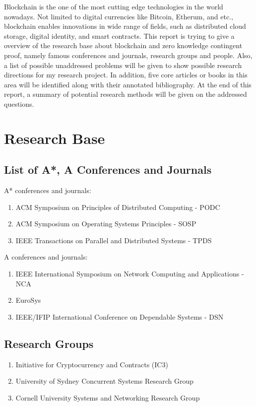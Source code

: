 Blockchain is the one of the most cutting edge technologies in the world nowadays. Not limited to digital currencies like Bitcoin, Etherum, and etc., blockchain enables innovations in wide range of fields, such as distributed cloud storage, digital identity, and smart contracts.
\newline
\newline
This report is trying to give a overview of the research base about blockchain and zero knowledge contingent proof, namely famous conferences and journals, research groups and people. Also, a list of possible unaddressed problems will be given to show possible research directions for my research project. In addition, five core articles or books in this area will be identified along with their annotated bibliography. At the end of this report, a summary of potential research methods will be given on the addressed questions.

\section{Research Base}
\label{sec:research base}

\subsection{List of A*, A Conferences and Journals}
A* conferences and journals:
\begin{enumerate}
\item ACM Symposium on Principles of Distributed Computing - PODC
\item ACM Symposium on Operating Systems Principles - SOSP
\item IEEE Transactions on Parallel and Distributed Systems - TPDS
\end{enumerate}
A conferences and journals:
\begin{enumerate}
\item IEEE International Symposium on Network Computing and Applications - NCA
\item EuroSys
\item IEEE/IFIP International Conference on Dependable Systems - DSN
\end{enumerate}

\subsection{Research Groups}

\begin{enumerate}
\item Initiative for Cryptocurrency and Contracts (IC3) 
\item University of Sydney Concurrent Systems Research Group
\item Cornell University Systems and Networking Research Group
\end{enumerate}

